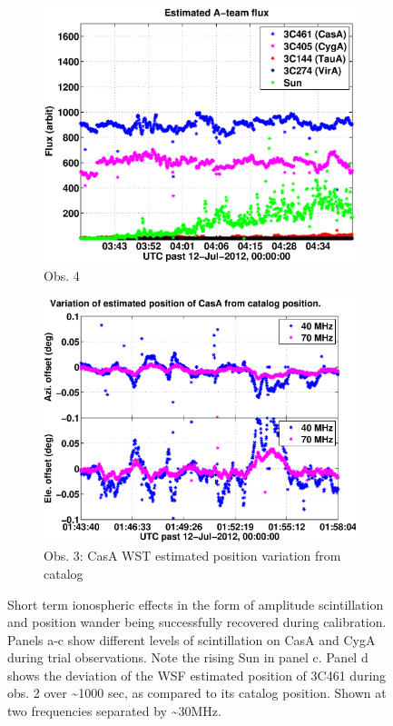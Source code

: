 \documentclass{aa}
\begin{document}
\begin{figure}[tbh]
\begin{subfigure}[b]{\columnwidth}
\includegraphics[width=\columnwidth]{Figs/combined_SB002_2_convcalsol_bin_sigmas.eps}
\caption{Obs. 4}
\end{subfigure}

\begin{subfigure}[b]{\columnwidth}
\includegraphics[width=\columnwidth]{Figs/CasAsrcposoff.eps}
\caption{Obs. 3: CasA WST estimated position variation from catalog}
\end{subfigure}

\caption{\label{fig:Estimated-flux-of}Short term ionospheric effects in the form
  of amplitude  scintillation and  position wander being  successfully recovered
  during calibration. Panels a-c show  different levels of scintillation on CasA
  and CygA  during trial observations. Note the  rising Sun in panel  c. Panel d
  shows the deviation of the WSF  estimated position of 3C461 during obs. 2 over
  \textasciitilde{}1000 sec, as  compared to its catalog position.  Shown at two
  frequencies separated by \textasciitilde{}30MHz.}
\end{figure}
\end{document}
